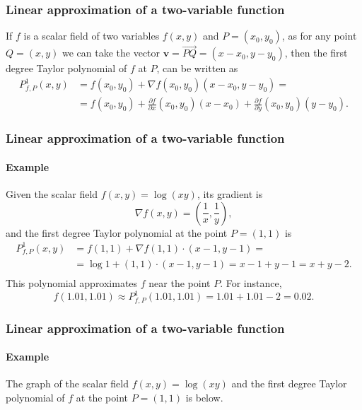 \begin{frame}
\frametitle{Linear approximation of a two-variable function}
If $f$ is a scalar field of two variables $f(x,y)$ and $P=(x_0,y_0)$, as for any point $Q=(x,y)$ we can take the vector $\mathbf{v}=\vec{PQ}=(x-x_0,y-y_0)$, then the first degree Taylor polynomial of $f$ at $P$, can be written as
\begin{align*}
P^1_{f,P}(x,y) &= f(x_0,y_0)+\nabla f(x_0,y_0)(x-x_0,y-y_0) =\\
&= f(x_0,y_0)+\frac{\partial f}{\partial x}(x_0,y_0)(x-x_0)+\frac{\partial f}{\partial y}(x_0,y_0)(y-y_0).
\end{align*}
\end{frame}


\begin{frame}
\frametitle{Linear approximation of a two-variable function}
\framesubtitle{Example}
Given the scalar field $f(x,y)=\log(xy)$, its gradient is
\[
\nabla f(x,y) = \left(\frac{1}{x},\frac{1}{y}\right),
\]
and the first degree Taylor polynomial at the point $P=(1,1)$ is
\begin{align*}
P^1_{f,P}(x,y) &= f(1,1) +\nabla f(1,1)\cdot (x-1,y-1) = \\
&= \log 1+(1,1)\cdot(x-1,y-1) = x-1+y-1 = x+y-2.\\
\end{align*}
This polynomial approximates $f$ near the point $P$.
For instance,
\[
f(1.01,1.01) \approx P^1_{f,P}(1.01,1.01) = 1.01+1.01-2 = 0.02.
\]
\end{frame}


\begin{frame}
\frametitle{Linear approximation of a two-variable function}
\framesubtitle{Example}
The graph of the scalar field $f(x,y)=\log(xy)$ and the first degree Taylor polynomial of $f$ at the point $P=(1,1)$ is below. 
\begin{center}

\end{center}
\end{frame}


